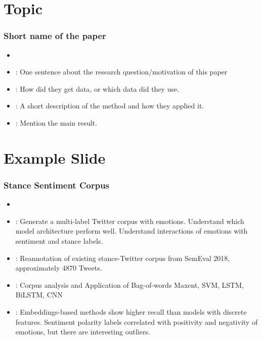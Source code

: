 \documentclass[compress,english]{beamer}
\author{Firstname Lastname}
\begin{document}
\section{Topic}
\begin{frame}
  \frametitle{Short name of the paper}
  \begin{itemize}
  \item {\footnotesize {}}
  \item {}: One sentence about the research question/motivation of this paper
  \item {}: How did they get data, or which data did they use.
  \item {}: A short description of the method and how they applied it.
  \item {}: Mention the main result.
  \end{itemize}  
\end{frame}


\section{Example Slide}

\begin{frame}
  \frametitle{Stance Sentiment Corpus}
  \begin{itemize}
  \item {\footnotesize {}}
  \item {}: Generate a multi-label Twitter corpus
    with emotions. Understand which model architecture perform
    well. Understand interactions of emotions with sentiment and
    stance labels.
  \item {}: Reannotation of existing stance-Twitter
    corpus from SemEval 2018, approximately 4870 Tweets.
  \item {}: Corpus analysis and Application of Bag-of-words Maxent, SVM, LSTM, BiLSTM, CNN
  \item {}: Embeddings-based methods show higher
    recall than models with discrete features. Sentiment polarity
    labels correlated with positivity and negativity of emotions, but
    there are interesting outliers.
  \end{itemize}
\end{frame}
\end{document}
